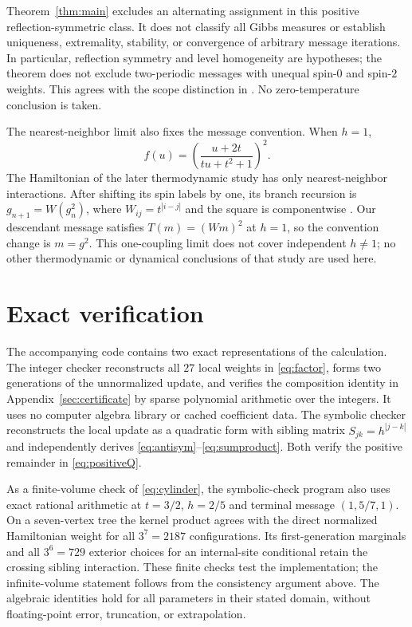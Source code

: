 \documentclass[11pt,a4paper]{article}
\numberwithin{equation}{section}
\begin{document}
Theorem~\ref{thm:main} excludes an alternating assignment in this
positive reflection-symmetric class. It does not classify all Gibbs
measures or establish uniqueness, extremality, stability, or convergence
of arbitrary message iterations. In particular, reflection symmetry and
level homogeneity are hypotheses; the theorem does not exclude
two-periodic messages with unequal spin-$0$ and spin-$2$ weights.
This agrees with the scope distinction in
\citet[Remark~5(a)]{KR2025}. No zero-temperature conclusion is taken.

The nearest-neighbor limit also fixes the message convention. When
$h=1$,
\begin{equation}
 f(u)=\left(\frac{u+2t}{tu+t^2+1}\right)^2.
 \label{eq:nearest}
\end{equation}
The Hamiltonian of the later thermodynamic study
\cite[Eq.~(2.1), p.~166]{RK2026} has only nearest-neighbor interactions.
After shifting its spin labels by one, its branch recursion is
$g_{n+1}=W(g_n^2)$, where $W_{ij}=t^{|i-j|}$ and the square is
componentwise \cite[Eq.~(2.4), p.~166]{RK2026}.
Our descendant message satisfies $T(m)=(Wm)^2$ at $h=1$, so the
convention change is $m=g^2$. This one-coupling limit does not cover
independent $h\ne1$; no other thermodynamic or dynamical conclusions
of that study are used here.

\section{Exact verification}
\label{sec:verification}
The accompanying code contains two exact representations of the
calculation. The integer checker reconstructs all $27$ local weights
in \eqref{eq:factor}, forms two generations of the unnormalized
update, and verifies the composition identity in
Appendix~\ref{sec:certificate} by sparse polynomial arithmetic over
the integers. It uses no computer algebra library or cached
coefficient data. The symbolic checker reconstructs the local update
as a quadratic form with sibling matrix $S_{jk}=h^{|j-k|}$ and
independently derives \eqref{eq:antisym}--\eqref{eq:sumproduct}.
Both verify the positive remainder in \eqref{eq:positiveQ}.

As a finite-volume check of \eqref{eq:cylinder}, the symbolic-check
program also uses exact rational arithmetic at $t=3/2$, $h=2/5$ and
terminal message $(1,5/7,1)$. On a seven-vertex tree the kernel product
agrees with the direct normalized Hamiltonian weight for all $3^7=2187$
configurations. Its first-generation marginals and all $3^6=729$
exterior choices for an internal-site conditional retain the crossing
sibling interaction. These finite checks test the implementation; the
infinite-volume statement follows from the consistency argument above.
The algebraic identities hold for all parameters in their stated domain,
without floating-point error, truncation, or extrapolation.
\end{document}
